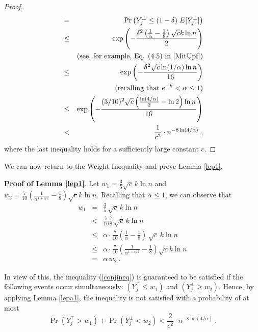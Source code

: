 \documentclass[11pt]{article}
\begin{document}
\begin{proof}
\begin{eqnarray*}
    	& =  &  \Pr\left(Y^{\perp}_{j} \le (1 - \delta)\; E[Y^{\perp}_j]\right) \nonumber\\      
    	&\le & \exp\left(-\frac{\delta^2  
         \left (\frac{1}{\alpha} - \frac{1}{8}\right )\sqrt{c} k \ln n}{2}\right) \\ 
        & & \text{(see, for example, Eq. (4.5) in \cite{MitUpf})} \nonumber \\
    	&\le & \exp\left(-\frac{\delta^2  
        \sqrt{c} \ln(1/\alpha) \ln n}{16}\right) \\ 
        & & \text{(recalling that $e^{-k} < \alpha \le 1$}) \\
    	&\le & \exp\left(-\frac{(3/10)^2  
         \sqrt{c} \left( \frac{\ln(4/\alpha)}{2} -\ln 2 \right)\ln n}{16}\right) \\         
    	&<& \frac{1}{c^2} \cdot n^{-{8 \ln(4/\alpha) } } \ , \nonumber
    \end{eqnarray*}
    where the last inequality holds for a sufficiently large constant $c$.   
\end{proof}

We can now return to the Weight Inequality and prove Lemma \ref{lep1}.

\medskip
\noindent
\textbf{Proof of Lemma \ref{lep1}}.
Let $w_1 = \frac{3 }{5}\sqrt{c}\, k \ln n$ and 
$w_2 = \frac{7}{10}\left(\frac{1}{\alpha^{1+\epsilon/2}} - \frac{1}{8} \right) \sqrt{c} k \ln n$.
Recalling that $\alpha \le 1$, we can observe that 
\begin{eqnarray*}
    w_1 & =    & \frac{3}{5}\, \sqrt{c}\, k \ln n \\
        & <    & \frac{7}{10} \frac{7}{ 8} \, \sqrt{c}\, k \ln n \\
        & \le  & \alpha \cdot\frac{7}{10} 
        \left(\frac{1}{\alpha } - \frac{1}{8 } \right)   \, \sqrt{c}\, k \ln n \\        
        & \le  &  \alpha\cdot \frac{7}{10}\left(\frac{1}{\alpha^{1+\epsilon/2}} - \frac{1}{8} \right) \sqrt{c} k \ln n\\
        & =    & \alpha\, w_2 \ .
\end{eqnarray*}

In view of this, the inequality (\ref{conjineq}) is guaranteed to be satisfied 
if the following events occur simultaneously: $(Y^{\top}_j \le w_1)$ and $(Y^{\perp}_j \ge w_2)$.
Hence,  by applying Lemma \ref{lepa1}, the inequality is not satisfied 
with a probability of at most
\begin{equation*}
    \Pr(Y^{\top}_j > w_1) + \Pr(Y^{\perp}_j < w_2) < 
    \frac{2}{c^2} \cdot n^{-8\ln(4/\alpha)}  
    \ .
\end{equation*} 
\end{document}
